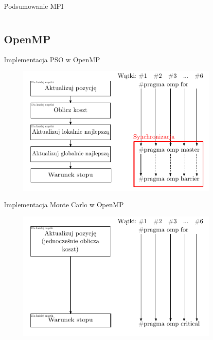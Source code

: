 \documentclass[handout]{beamer}
\begin{document}
\begin{frame}{Podsumowanie MPI}
\begin{columns}
\begin{column}[t]{0.5\textwidth}
\end{column}
\end{columns}
\end{frame}



\subsection{OpenMP}
\begin{frame}{Implementacja PSO w OpenMP}
\begin{figure}[t]
\includegraphics[width=0.9\textwidth]{grafiki/alg_OpenMP_synchronizacja.pdf}
\end{figure}
\end{frame}

\begin{frame}{Implementacja Monte Carlo w OpenMP}
\begin{figure}[t]
\includegraphics[width=0.9\textwidth]{grafiki/alg_OpenMP_MC.pdf}
\end{figure}
\end{frame}
\end{document}
